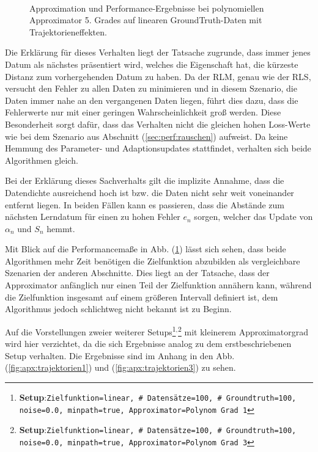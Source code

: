 \documentclass[a4paper, 12pt]{article}
\begin{document}
{\begin{figure}[H]
\begin{subfigure}[b]{0.4\textwidth}
                \caption{}
                \label{fig:perf:trajektorien5:perf}
        \end{subfigure}
        \\
        \caption{Approximation und Performance-Ergebnisse bei polynomiellen Approximator 5. Grades auf linearen GroundTruth-Daten mit Trajektorieneffekten.}
        \label{fig:perf:trajektorien5}
\end{figure}
Die Erklärung für dieses Verhalten liegt der Tatsache zugrunde, dass immer jenes Datum als nächstes präsentiert wird, welches die Eigenschaft hat, die kürzeste Distanz zum vorhergehenden Datum zu haben. Da der RLM, genau wie der RLS, versucht den Fehler zu allen Daten zu minimieren und in diesem Szenario, die Daten immer nahe an den vergangenen Daten liegen, führt dies dazu, dass die Fehlerwerte nur mit einer geringen Wahrscheinlichkeit groß werden. Diese Besonderheit sorgt dafür, dass das Verhalten nicht die gleichen hohen Loss-Werte wie bei dem Szenario aus Abschnitt (\ref{sec:perf:rauschen}) aufweist. Da keine Hemmung des Parameter- und Adaptionsupdates stattfindet, verhalten sich beide Algorithmen gleich.

Bei der Erklärung dieses Sachverhalts gilt die implizite Annahme, dass die Datendichte ausreichend hoch ist bzw. die Daten nicht sehr weit voneinander entfernt liegen. In beiden Fällen kann es passieren, dass die Abstände zum nächsten Lerndatum für einen zu hohen Fehler $e_n$ sorgen, welcher das Update von $\alpha_n$ und $S_n$ hemmt.

Mit Blick auf die Performancemaße in Abb. (\ref{fig:perf:trajektorien5:perf}) lässt sich sehen, dass beide Algorithmen mehr Zeit benötigen die Zielfunktion abzubilden als vergleichbare Szenarien der anderen Abschnitte. Dies liegt an der Tatsache, dass der Approximator anfänglich nur einen Teil der Zielfunktion annähern kann, während die Zielfunktion insgesamt auf einem größeren Intervall definiert ist, dem Algorithmus jedoch schlichtweg nicht bekannt ist zu Beginn.

Auf die Vorstellungen zweier weiterer Setups\footnote{\textbf{Setup}:\quad\texttt{Zielfunktion=linear, \# Datensätze=100, \# Groundtruth=100, noise=0.0, minpath=true, Approximator=Polynom Grad 1}}$^,$\footnote{\textbf{Setup}:\quad\texttt{Zielfunktion=linear, \# Datensätze=100, \# Groundtruth=100, noise=0.0, minpath=true, Approximator=Polynom Grad 3}} mit kleinerem Approximatorgrad wird hier verzichtet, da die sich Ergebnisse analog zu dem erstbeschriebenen Setup verhalten. Die Ergebnisse sind im Anhang in den Abb. (\ref{fig:apx:trajektorien1}) und (\ref{fig:apx:trajektorien3}) zu sehen.


}
\end{document}
